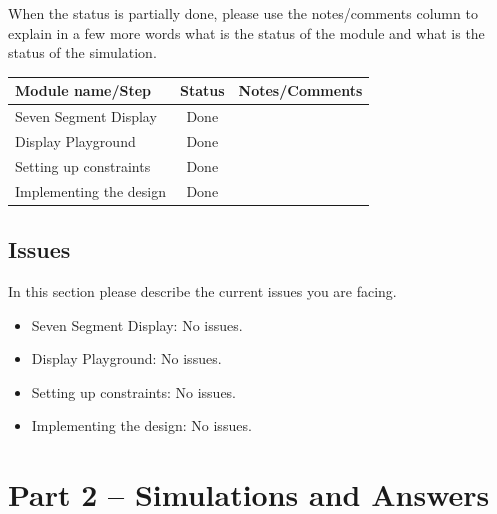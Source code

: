 \documentclass[12pt,a4paper]{article}
\begin{document}
When the status is partially done, please use the notes/comments column to explain in a few more words what is the status of the module and what is the status of the simulation.

\vspace{0.5cm}
\begin{table}[H]
    \centering
    \begin{tabular}{|l|c|l|}
        \hline
        \textbf{Module name/Step} & \textbf{Status} & \textbf{Notes/Comments} \\
        \hline
        Seven Segment Display     & Done             &                          \\
        \hline
        Display Playground        & Done             &                          \\
        \hline
        Setting up constraints    & Done             &                          \\
        \hline
        Implementing the design   & Done             &                          \\
        \hline
    \end{tabular}
\end{table}

\subsection*{Issues}
In this section please describe the current issues you are facing.

\begin{itemize}[nosep]
    \item Seven Segment Display: No issues.
    \item Display Playground: No issues.
    \item Setting up constraints: No issues.
    \item Implementing the design: No issues.
\end{itemize}

\newpage
\section*{Part 2 -- Simulations and Answers}

\end{document}
